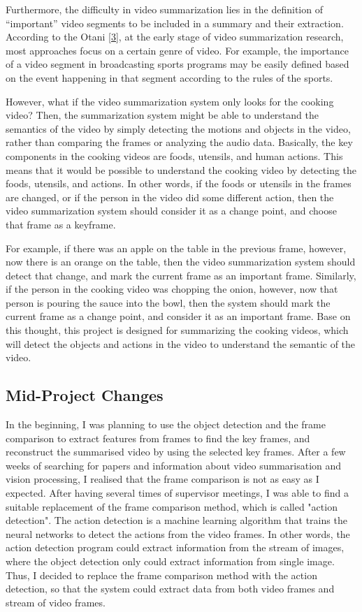\documentclass{article}
\begin{document}
Furthermore, the difficulty in video summarization lies in the definition of “important” video segments to be included in a summary and their extraction. According to the Otani \hyperlink{ref3}{[3]}, at the early stage of video summarization research, most approaches focus on a certain genre of video. For example, the importance of a video segment in broadcasting sports programs may be easily defined based on the event happening in that segment according to the rules of the sports.

However, what if the video summarization system only looks for the cooking video? Then, the summarization system might be able to understand the semantics of the video by simply detecting the motions and objects in the video, rather than comparing the frames or analyzing the audio data. Basically, the key components in the cooking videos are foods, utensils, and human actions. This means that it would be possible to understand the cooking video by detecting the foods, utensils, and actions. In other words, if the foods or utensils in the frames are changed, or if the person in the video did some different action, then the video summarization system should consider it as a change point, and choose that frame as a keyframe.

For example, if there was an apple on the table in the previous frame, however, now there is an orange on the table, then the video summarization system should detect that change, and mark the current frame as an important frame. Similarly, if the person in the cooking video was chopping the onion, however, now that person is pouring the sauce into the bowl, then the system should mark the current frame as a change point, and consider it as an important frame. Base on this thought, this project is designed for summarizing the cooking videos, which will detect the objects and actions in the video to understand the semantic of the video.

\subsection{Mid-Project Changes}

In the beginning, I was planning to use the object detection and the frame comparison to extract features from frames to find the key frames, and reconstruct the summarised video by using the selected key frames. After a few weeks of searching for papers and information about video summarisation and vision processing, I realised that the frame comparison is not as easy as I expected. After having several times of supervisor meetings, I was able to find a suitable replacement of the frame comparison method, which is called "action detection". The action detection is a machine learning algorithm that trains the neural networks to detect the actions from the video frames. In other words, the action detection program could extract information from the stream of images, where the object detection only could extract information from single image. Thus, I decided to replace the frame comparison method with the action detection, so that the system could extract data from both video frames and stream of video frames.
\end{document}
